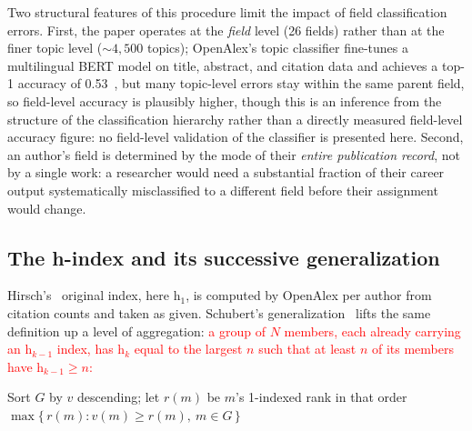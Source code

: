Two structural features of this procedure limit the impact of field classification errors. First, the paper operates at the \emph{field} level (26 fields) rather than at the finer topic level (${\sim}4{,}500$ topics); OpenAlex's topic classifier fine-tunes a multilingual BERT model on title, abstract, and citation data and achieves a top-1 accuracy of 0.53~\citep{vaneck2024}, but many topic-level errors stay within the same parent field, so field-level accuracy is plausibly higher, though this is an inference from the structure of the classification hierarchy rather than a directly measured field-level accuracy figure: no field-level validation of the classifier is presented here. Second, an author's field is determined by the mode of their \emph{entire publication record}, not by a single work: a researcher would need a substantial fraction of their career output systematically misclassified to a different field before their assignment would change.

\subsection{The h-index and its successive generalization}
Hirsch's~\citeyearpar{hindex} original index, here $\mathrm{h}_1$, is computed by OpenAlex per author from citation counts and taken as given. Schubert's generalization~\citeyearpar{parent} lifts the same definition up a level of aggregation: \textcolor{red}{a group of $N$ members, each already carrying an $\mathrm{h}_{k-1}$ index, has $\mathrm{h}_k$ equal to the largest $n$ such that at least $n$ of its members have $\mathrm{h}_{k-1} \geq n$:}

\begin{algorithm}
\caption{Successive h-index of a group $G$, given a value $v(m)$ for each member $m \in G$}
\begin{algorithmic}[1]
\State Sort $G$ by $v$ descending; let $r(m)$ be $m$'s 1-indexed rank in that order
\State \Return $\max \{\, r(m) : v(m) \geq r(m),\ m \in G \,\}$
\end{algorithmic}
\end{algorithm}

